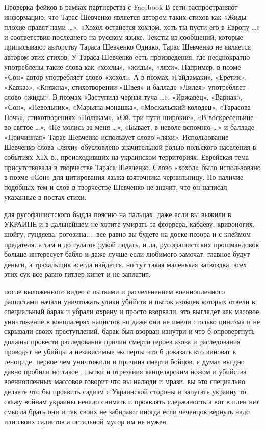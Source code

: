 Проверка фейков в рамках партнерства с Facebook
В сети распространяют информацию, что Тарас Шевченко является автором таких стихов как «Жиды плохие правят нами …», «Хохол останется хохлом, хоть ты пусти его в Европу …» и соответствия последнего на русском языке.
Тексты из сообщений, которые приписывают авторству Тараса Шевченко
Однако, Тарас Шевченко не является автором этих стихов.
У Тараса Шевченко есть произведения, где неоднократно употреблены такие слова как «хохлы», «жиды», «ляхи».
Например, в поэме «Сон» автор употребляет слово «хохол». А в поэмах «Гайдамаки», «Еретик», «Кавказ», «Княжна», стихотворении «Швея» и балладе «Лилея» употребляет слово «жиды».
В поэмах «Заступила черная туча …», «Иржавец», «Варнак», «Сон», «Невольник», «Марьяна-монашка», «Москальский колодец», «Тарасова Ночь», стихотворениях «Полякам», «Ой, три пути широкие», «В воскресеньице во святое …», «Не молись за меня …», «Бывает, в неволе вспомню …» и балладе «Причинная» Тарас Шевченко использует слово «ляхи».
Использование Шевченко слова «ляхи» обусловлено значительной ролью польского населения в событиях XIX в., происходивших на украинском территориях. Еврейская тема присутствовала в творчестве Тараса Шевченко. Слово «хохол» было использовано в поэме «Сон» для цитирования языка взяточника-чернильницу. Но наличие подобных тем и слов в творчестве Шевченко не значит, что он написал указанные в постах стихи.

для русофашистского быдла поясню на пальцах. даже если вы выжили в УКРАИНЕ и в
дальнейшем не хотите умирать за фюррера, кабаеву, кривоногих, шойгу, гундяева,
рогозина.... все равно вы будете на доске позора и с клеймом предателя. а там и
до гулагов рукой подать. и да, русофашистских прошмандовок больше интересует
бабло и даже лучше если любимого замочат. главное будут деньги, а трахальщик
всегда найдется. но тут такая маленькая загвоздка. всех этих сук все равно
гитлер кинет и не заплатит.

после выложенного видео с пытками и расчеленением военнопленного рашистами
начали уничтожать улики убийств и пыток азовцев которых отвели в специальный
барак и убрали охрану и просто взорвали. это выглядет как масовое уничтожение в
концлагерях нацистов но даже они не имели столько цинизма и не скрывали своих
преступлений. барак был взорван изнутри и что б опровергнуть должны провести
раследования причин смерти героев азова и раследования проводят не убийцы а
независимые эксперты что б доказать кто виноват в геноциде. первое чем
уничтожили и причина смерти бойцов. я думал вы дно давно пробили но такое .
пытки и отрезания канцелярским ножом и убийства военнопленных массовое говорит
что вы нелюди и мрази. вы это специально делаете что бы проявить садизм с
Украинской стороны и запугать украину то скажу войнам украины ненадо снимать и
проявлять сдержаность а вот в плен нет смысла брать они и так своих не забирают
иногда если чеченцов вернуть надо или своих садистов а остальной мусор им не
нужен.

